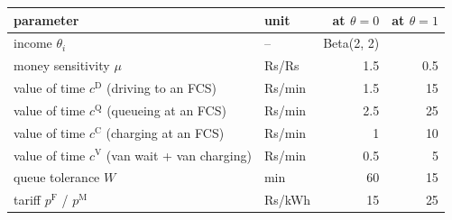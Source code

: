 \begin{tabular}{@{}llrr@{}}
\toprule
parameter & unit & at $\theta=0$ & at $\theta=1$ \\
\midrule
income $\theta_i$ & -- & Beta(2, 2) &  \\
money sensitivity $\mu$ & Rs/Rs & 1.5 & 0.5 \\
value of time $c^{\mathrm{D}}$ (driving to an FCS) & Rs/min & 1.5 & 15 \\
value of time $c^{\mathrm{Q}}$ (queueing at an FCS) & Rs/min & 2.5 & 25 \\
value of time $c^{\mathrm{C}}$ (charging at an FCS) & Rs/min & 1 & 10 \\
value of time $c^{\mathrm{V}}$ (van wait + van charging) & Rs/min & 0.5 & 5 \\
queue tolerance $W$ & min & 60 & 15 \\
tariff $p^{\mathrm F}$ / $p^{\mathrm M}$ & Rs/kWh & 15 & 25 \\
\bottomrule
\end{tabular}
